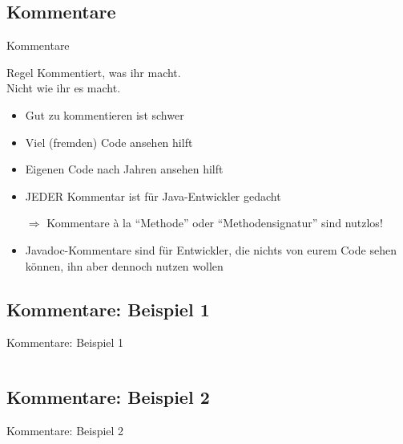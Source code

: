 \documentclass[usepdftitle=false,hyperref={pdfpagelabels=false}]{beamer}
\begin{document}
\subsection{Kommentare}
\begin{frame}{Kommentare}
    \begin{block}{Regel}
        Kommentiert, was ihr macht. \\
        Nicht wie ihr es macht.
    \end{block}

    \begin{itemize}[<+->]
        \item Gut zu kommentieren ist schwer
        \item Viel (fremden) Code ansehen hilft
        \item Eigenen Code nach Jahren ansehen hilft
        \item JEDER Kommentar ist für Java-Entwickler gedacht
        \item[$\Rightarrow$] Kommentare à la "`Methode"' oder
              "`Methodensignatur"' sind nutzlos!\\
        \item Javadoc-Kommentare sind für Entwickler, die nichts von
              eurem Code sehen können, ihn aber dennoch nutzen wollen
    \end{itemize}
\end{frame}

\subsection{Kommentare: Beispiel 1}
\begin{frame}{Kommentare: Beispiel 1}
    \inputminted[linenos=true, numbersep=5pt, tabsize=4, fontsize=\tiny]{java}{Kommentare-1.java}

\end{frame}

\subsection{Kommentare: Beispiel 2}
\begin{frame}{Kommentare: Beispiel 2}
    \inputminted[linenos=true, numbersep=5pt, tabsize=4, fontsize=\small]{java}{Kommentare-2.java}
\end{frame}
\end{document}
